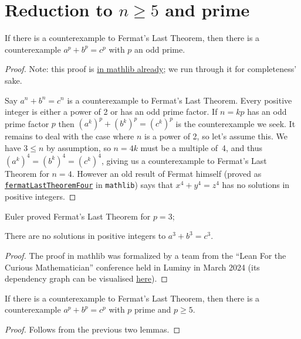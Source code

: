 \section{Reduction to \texorpdfstring{$n\geq5$}{ngeq5} and prime}

\begin{lemma}\label{FermatLastTheorem.of_odd_primes}\leanok
  If there is a counterexample to Fermat's Last Theorem, then there is a counterexample $a^p+b^p=c^p$
  with $p$ an odd prime.
\end{lemma}
\begin{proof}\leanok
  Note: this proof is \href{https://leanprover-community.github.io/mathlib4_docs/Mathlib/NumberTheory/FLT/Four.html#FermatLastTheorem.of_odd_primes}{in mathlib already};
  we run through it for completeness' sake.

  Say $a^n + b^n = c^n$ is a counterexample to Fermat's Last Theorem. Every positive integer is either
  a power of 2 or has an odd prime factor. If $n=kp$ has an odd prime factor $p$ then
  $(a^k)^p+(b^k)^p=(c^k)^p$ is the counterexample we seek. It remains to deal with the case where
  $n$ is a power of 2, so let's assume this. We have $3\leq n$ by assumption, so
  $n=4k$ must be a multiple of~4, and thus $(a^k)^4=(b^k)^4=(c^k)^4$, giving us a counterexample
  to Fermat's Last Theorem for $n=4$. However an old result of Fermat himself (proved as
  \href{https://leanprover-community.github.io/mathlib4_docs/Mathlib/NumberTheory/FLT/Four.html#fermatLastTheoremFour}{\tt fermatLastTheoremFour}
  in {\tt mathlib}) says that $x^4+y^4=z^4$ has no solutions in positive integers.
\end{proof}

Euler proved Fermat's Last Theorem for $p=3$;

\begin{lemma}\label{fermatLastTheoremThree}\leanok
{}
  There are no solutions in positive integers to $a^3+b^3=c^3$.
\end{lemma}
\begin{proof}
  \leanok
  The proof in mathlib was formalized by a team from the ``Lean For the Curious Mathematician'' conference held in Luminy in March 2024
  (its dependency graph can be visualised \href{https://pitmonticone.github.io/FLT3/blueprint/dep_graph_document.html}{\underline{here}}).
\end{proof}

\begin{corollary}\label{FermatLastTheorem.of_p_ge_5}\leanok If there is a counterexample to
  Fermat's Last Theorem, then there is a counterexample $a^p+b^p=c^p$ with $p$ prime and $p\geq 5$.
\end{corollary}
\begin{proof}\leanok Follows from the
  previous two lemmas.\end{proof}

